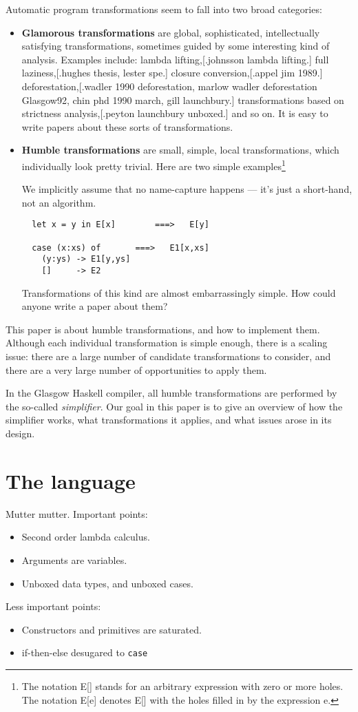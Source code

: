 \documentclass[11pt]{article}
\begin{document}
Automatic program transformations seem to fall into two broad categories:
\begin{itemize}
\item {\bf Glamorous transformations} are global, sophisticated,
intellectually satisfying transformations, sometimes guided by some
interesting kind of analysis.
Examples include: 
lambda lifting,[.johnsson lambda lifting.]
full laziness,[.hughes thesis, lester spe.]
closure conversion,[.appel jim 1989.]
deforestation,[.wadler 1990 deforestation, marlow wadler deforestation Glasgow92, chin phd 1990 march, gill launchbury.]
transformations based on strictness analysis,[.peyton launchbury unboxed.]
and so on.  It is easy to write papers about these sorts of transformations.

\item {\bf Humble transformations} are small, simple, local transformations, 
which individually look pretty trivial.  Here are two simple examples\footnote{
The notation  E[]  stands for an arbitrary expression with zero or more holes.
The notation E[e] denotes E[] with the holes filled in by the expression e.  }

We implicitly assume that no name-capture happens --- it's just
a short-hand, not an algorithm.
\begin{lstlisting}
  let x = y in E[x]   	   ===>   E[y]

  case (x:xs) of 	   ===>   E1[x,xs]
    (y:ys) -> E1[y,ys]	
    []     -> E2
\end{lstlisting}
Transformations of this kind are almost embarrassingly simple.  How could
anyone write a paper about them?
\end{itemize}
This paper is about humble transformations, and how to implement them. 
Although each individual
transformation is simple enough, there is a scaling issue:  
there are a large number of candidate transformations to consider, and
there are a very large number of opportunities to apply them.

In the Glasgow Haskell compiler, all humble transformations
are performed by the so-called {\em simplifier}.  
Our goal in this paper is to give an overview of how the simplifier works, what
transformations it applies, and what issues arose in its design.

\section{The language}

Mutter mutter.  Important points:
\begin{itemize}
\item Second order lambda calculus.
\item Arguments are variables.
\item Unboxed data types, and unboxed cases.
\end{itemize}
Less important points:
\begin{itemize}
\item Constructors and primitives are saturated.
\item if-then-else desugared to \texttt{case}
\end{itemize}
\end{document}
